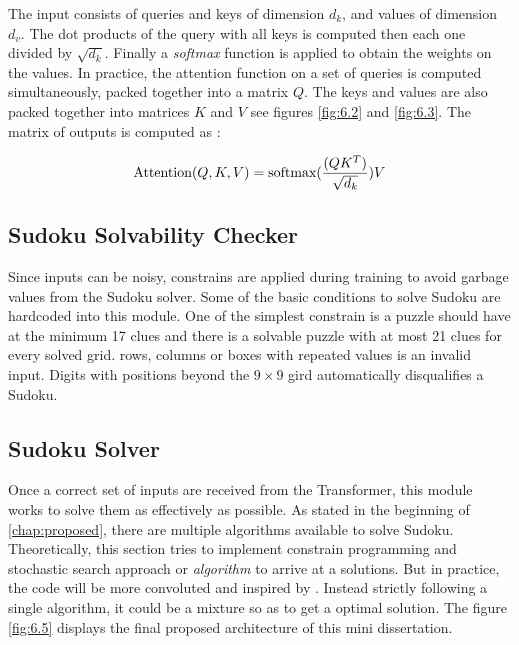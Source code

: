 \documentclass[12pt, a4paper]{report}
\begin{document}
The input consists of queries and keys of dimension $d_k$, and values of dimension $d_v$. The dot products of the query with all keys is computed then each one divided by $\sqrt{d_k}$. Finally a \emph{softmax} function is applied to obtain the weights on the values. In practice, the attention function on a set of queries is computed simultaneously, packed together into a matrix $Q$. The keys and values are also packed together into matrices $K$ and $V$ see figures \eqref{fig:6.2} and \eqref{fig:6.3}. The matrix of outputs is computed as \cite{2017arXiv170603762V}:

\begin{equation}
    \label{equ:6.1}
    \textnormal{Attention}(Q, K, V) = \textnormal{softmax}(\frac{(Q K^T)}{\sqrt{d_k}})V
\end{equation}

\subsection{Sudoku Solvability Checker}
\label{subsec:sdksolchk}
\hspace{0.5cm} Since inputs can be noisy, constrains are applied during training to avoid garbage values from the Sudoku solver. Some of the basic conditions to solve Sudoku are hardcoded into this module. One of the simplest constrain is a puzzle should have at the minimum 17 clues and there is a solvable puzzle with at most 21 clues for every solved grid. rows, columns or boxes with repeated values is an invalid input. Digits with positions beyond the $9\times 9$ gird automatically disqualifies a Sudoku.

\subsection{Sudoku Solver}
\label{subsec:solvsdk}

\hspace{0.5cm} Once a correct set of inputs are received from the Transformer, this module works to solve them as effectively as possible. As stated in the beginning of \eqref{chap:proposed}, there are multiple algorithms available to solve Sudoku. Theoretically, this section tries to implement constrain programming and stochastic search approach or \emph{algorithm} to arrive at a solutions. But in practice, the code will be more convoluted and inspired by \cite{gh:AliShazly:sudkpy}. Instead strictly following a single algorithm, it could be a mixture so as to get a optimal solution. The figure \eqref{fig:6.5} displays the final proposed architecture of this mini dissertation.
\end{document}
